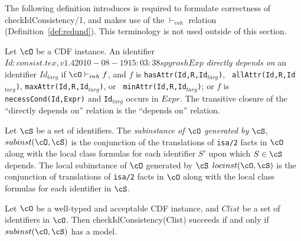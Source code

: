 The following definition introduces is required to formulate
correctness of {\sf checkIdConsistency/1}, and makes use of the
$\vdash_{inh}$ relation (Definition~\ref{def:redund}).  This
terminology is not used outside of this section.
\begin{definition}
 Let $\cO$ be a CDF instance.  An identifier $Id: consist.tex,v 1.4 2010-08-19 15:03:38 spyrosh Exp $ {\em directly
 depends on} an identifier $Id_{targ}$ if $\cO \vdash_{inh} f$, and
 $f$ is {\tt hasAttr(Id,R,Id$_{targ}$)}, {\tt
 allAttr(Id,R,Id$_{targ}$)}, {\tt maxAttr(Id,R,Id$_{targ}$)}, or {\tt
 minAttr(Id,R,Id$_{targ}$)}; or $f$ is {\tt necessCond(Id,Expr)} and
 {\tt Id$_{targ}$} occurs in $Expr$.  The transitive closure of the
 ``directly depends on'' relation is the ``depends on'' relation.

Let $\cS$ be a set of identifiers.  The {\em subinstance of $\cO$
generated by $\cS$}, $subinst(\cO,\cS)$ is the conjunction of the
translations of {\tt isa/2} facts in $\cO$ along with the local class
formulas for each identifier $S'$ upon which $S \in \cS$ depends.  The
local subinstance of $\cO$ generated by $\cS$ $locinst(\cO,\cS)$ is
the conjunction of translations of {\tt isa/2} facts in $\cO$ along
with the local class formulas for each identifier in $\cS$.
\end{definition}

\begin{theorem} \label{thm:type1consist}
Let $\cO$ be a well-typed and acceptable CDF instance, and $Clist$ be
a set of identifiers in $\cO$.  Then {\sf checkIdConsistency(Clist)}
succeeds if and only if $subinst(\cO,\cS)$ has a model.
\end{theorem}

